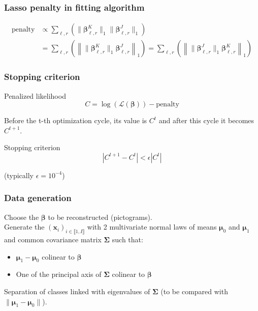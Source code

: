 \documentclass{beamer}
\begin{document}
\begin{frame}
    \frametitle{Lasso penalty in fitting algorithm}

    \begin{align}
        \text{penalty} &\propto \sum\limits_{\ell,r} \left( \lVert \bm{\beta}_{\ell,r}^K \rVert_1 \lVert \bm{\beta}_{\ell,r}^J \rVert_1 \right)\\
        &= \sum\limits_{\ell,r} \left( \left\lVert  \lVert\bm{\beta}_{\ell,r}^K \rVert_1  \bm{\beta}_{\ell,r}^J \right\rVert_1 \right)  = \sum\limits_{\ell,r} \left( \left\lVert  \lVert\bm{\beta}_{\ell,r}^J \rVert_1  \bm{\beta}_{\ell,r}^K \right\rVert_1  \right)
    \end{align}

\end{frame}

\begin{frame}
    \frametitle{Stopping criterion}
    \begin{block}{Penalized likelihood}
    $$C=  \log(\mathcal{L}(\bm{\beta})) -\text{penalty}$$
    \end{block}
    Before the t-th optimization cycle, its value is $C^{t}$ and after this cycle it becomes $C^{t + 1}$.\\[5 pt]
    \begin{block}{Stopping criterion}
    $$ |C^{t + 1} - C^t| < \epsilon |C^t|$$
    \end{block}
    (typically $\epsilon = 10^{-4}$)
\end{frame}

\begin{frame}
    \frametitle{Data generation}
    Choose the $\bm{\beta}$ to be reconstructed (pictograms).\\[10 pt]
    Generate the $(\mathbf{x}_i)_{i \in \llbracket 1, I\rrbracket}$ with 2 multivariate normal laws of means $\bm{\mu}_0$ and $\bm{\mu}_1$ and common covariance matrix $\bm{\Sigma}$ such that:
    \begin{itemize}
        \item $\bm{\mu}_1 - \bm{\mu}_0$ colinear to $\bm{\beta}$\\[10 pt]
        \item One of the principal axis of $\bm{\Sigma}$ colinear to $\bm{\beta}$
    \end{itemize}
    Separation of classes linked with eigenvalues of $\bm{\Sigma}$ (to be compared with $\lVert\bm{\mu}_1 - \bm{\mu}_0 \rVert$).
\end{frame}
\end{document}
